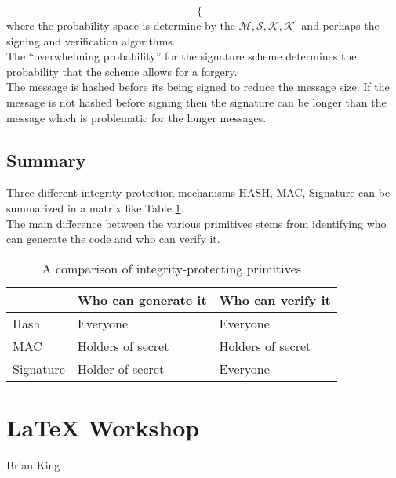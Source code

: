 \documentclass[%
  slidesonly,%
  semlayer%
  ]{xseminar}                                  %
\begin{document}
\begin{slide}
\begin{equation}
\begin{cases}
      \end{cases}
      \label{eq:verification}
    \end{equation}
    where the probability space is determine by the $\mathcal {M, S, K, K^{'}}$ and perhaps the signing and verification algorithms.\\
    The ``overwhelming probability'' for the signature scheme determines the probability that the scheme allows for a forgery.\\
    The message is hashed before its being signed to reduce the message size. 
    If the message is not hashed before signing then the signature can be longer than the message which is problematic for the longer messages.
    \clearpage

  \subsection*{Summary}
    Three different integrity-protection mechanisms HASH, MAC, Signature can be summarized in a matrix like Table \ref{table:summary}.\\
    The main difference between the various primitives stems from identifying who can generate the code and who can verify it.
    \begin{table}[!htb] 
      \begin{center}
        \begin{tabular}{ |l || l| l| }
          \hline
           & Who can generate it & Who can verify it \\
          \hline
          \hline
          Hash & Everyone & Everyone \\ 
          \hline
          MAC & Holders of secret & Holders of secret \\
          \hline
          Signature & Holder of secret & Everyone \\
          \hline
        \end{tabular}
      \end{center}
      \caption{A comparison of integrity-protecting primitives}
      \label{table:summary}
    \end{table}
    \clearpage

\section*{\LaTeX{ } Workshop}

  \vspace{.75in}


  Brian King


\end{slide}
\end{document}
